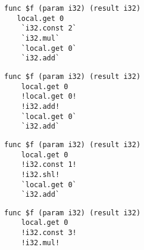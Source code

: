 
\lstset{
    language=WAT,
    style=nccode,
    basicstyle=\footnotesize\ttfamily,
    columns=fullflexible,
    breaklines=true
}


\begin{code}
    \centering
    \label{example:crow:variants:wasm}
    \lstset{numbers=none}
    \noindent\begin{minipage}[t]{.45\linewidth}
    \begin{lstlisting}[xleftmargin=1em,escapechar=?]
func $f (param i32) (result i32)
   local.get 0
    `i32.const 2`
    `i32.mul`
    `local.get 0`
    `i32.add`

        \end{lstlisting}
\begin{lstlisting}[xleftmargin=1em,escapechar=?]
func $f (param i32) (result i32)
    local.get 0
    !local.get 0!
    !i32.add!
    `local.get 0`
    `i32.add`

                \end{lstlisting}
    \end{minipage}\hfill
    \noindent\begin{minipage}[t]{.45\linewidth}
\begin{lstlisting}[xleftmargin=1em,escapechar=?]
func $f (param i32) (result i32)
    local.get 0
    !i32.const 1!
    !i32.shl!
    `local.get 0`
    `i32.add`

    \end{lstlisting}
\begin{lstlisting}[xleftmargin=1em,escapechar=?]
func $f (param i32) (result i32)
    local.get 0
    !i32.const 3!
    !i32.mul!

            \end{lstlisting}
        \end{minipage}
\end{code}


